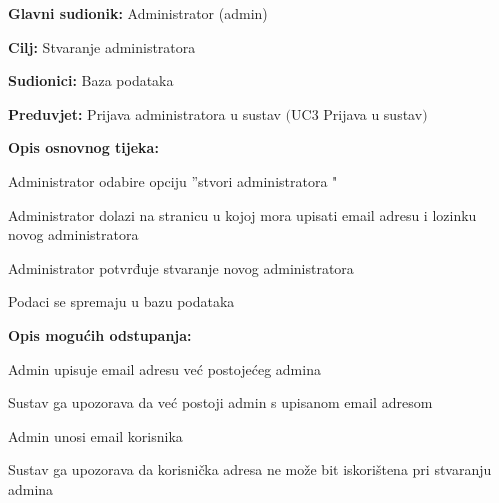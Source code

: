 \noindent {}
\begin{packed_item}

	\item \textbf{Glavni sudionik:} Administrator (admin)
	\item  \textbf{Cilj:} Stvaranje administratora
	\item  \textbf{Sudionici:} Baza podataka
	\item  \textbf{Preduvjet:} Prijava administratora u sustav $($UC3 Prijava u sustav$)$
	\item  \textbf{Opis osnovnog tijeka:}
	
	\item[] \begin{packed_enum}

		\item Administrator odabire opciju ”stvori administratora "
		\item Administrator dolazi na stranicu u kojoj mora upisati email adresu i lozinku novog administratora
		\item Administrator potvrđuje stvaranje novog administratora
		\item Podaci se spremaju u bazu podataka
	\end{packed_enum}
	
	\item  \textbf{Opis mogućih odstupanja:}
	
	\item[] \begin{packed_item}

		\item[2.a] Admin upisuje email adresu već postojećeg admina
		\item[] \begin{packed_enum}
			
			\item Sustav ga upozorava da već postoji admin s upisanom email adresom							
		\end{packed_enum}

		\item[2.b] Admin unosi email korisnika
		\item[] \begin{packed_enum}
			
			\item Sustav ga upozorava da korisnička adresa ne može bit iskorištena pri stvaranju admina								
		\end{packed_enum}
		
	\end{packed_item}
\end{packed_item}

